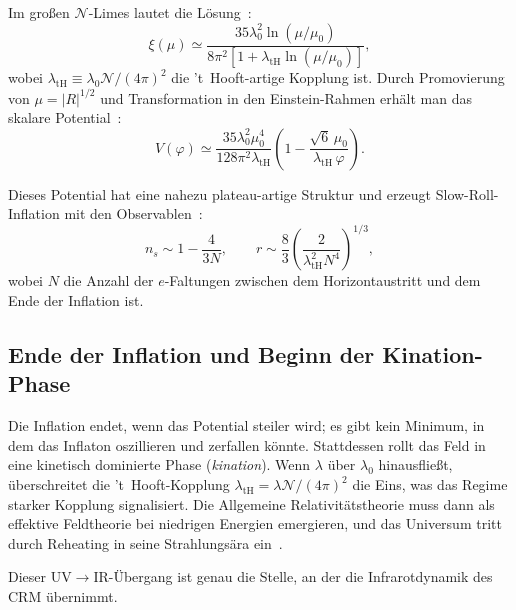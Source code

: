 \documentclass[aps,prd,twocolumn,superscriptaddress,nofootinbib]{revtex4-2}
\begin{document}
Im großen $\mathcal{N}$-Limes lautet die Lösung~\cite{LiuQuintinAfshordi2026}:
\begin{equation}
\xi(\mu) \simeq \frac{35\lambda_0^2\ln(\mu/\mu_0)}{8\pi^2[1 + \lambda_\mathrm{tH}\ln(\mu/\mu_0)]},
\label{eq:xi-solution}
\end{equation}
wobei $\lambda_\mathrm{tH} \equiv \lambda_0\mathcal{N}/(4\pi)^2$ die 't~Hooft-artige Kopplung ist. Durch Promovierung von $\mu = |R|^{1/2}$ und Transformation in den Einstein-Rahmen erhält man das skalare Potential~\cite{LiuQuintinAfshordi2026}:
\begin{equation}
V(\varphi) \simeq \frac{35\lambda_0^2\mu_0^4}{128\pi^2\lambda_\mathrm{tH}}\left(1 - \frac{\sqrt{6}\,\mu_0}{\lambda_\mathrm{tH}\,\varphi}\right).
\label{eq:einstein-potential}
\end{equation}

Dieses Potential hat eine nahezu plateau-artige Struktur und erzeugt Slow-Roll-Inflation mit den Observablen~\cite{LiuQuintinAfshordi2026}:
\begin{equation}
n_s \sim 1 - \frac{4}{3N}, \qquad r \sim \frac{8}{3}\left(\frac{2}{\lambda_\mathrm{tH}^2 N^4}\right)^{1/3},
\label{eq:ns-r}
\end{equation}
wobei $N$ die Anzahl der $e$-Faltungen zwischen dem Horizontaustritt und dem Ende der Inflation ist.

\subsection{Ende der Inflation und Beginn der Kination-Phase}

Die Inflation endet, wenn das Potential steiler wird; es gibt kein Minimum, in dem das Inflaton oszillieren und zerfallen könnte. Stattdessen rollt das Feld in eine kinetisch dominierte Phase (\textit{kination}). Wenn $\lambda$ über $\lambda_0$ hinausfließt, überschreitet die 't~Hooft-Kopplung $\lambda_\mathrm{tH} = \lambda\mathcal{N}/(4\pi)^2$ die Eins, was das Regime starker Kopplung signalisiert. Die Allgemeine Relativitätstheorie muss dann als effektive Feldtheorie bei niedrigen Energien emergieren, und das Universum tritt durch Reheating in seine Strahlungsära ein~\cite{LiuQuintinAfshordi2026}.

Dieser UV$\to$IR-Übergang ist genau die Stelle, an der die Infrarotdynamik des CRM übernimmt.


\end{document}
